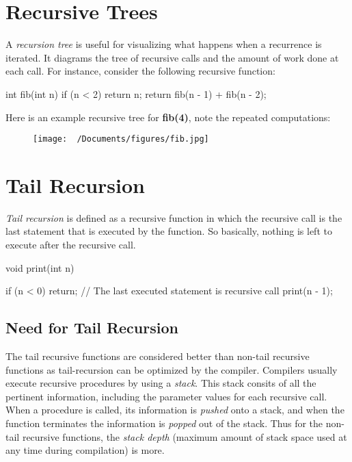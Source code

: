 \documentclass{report}
\begin{document}
\section{Recursive Trees}
A \textit{recursion tree} is useful for visualizing what happens when a recurrence is iterated. It diagrams the tree of recursive calls and the amount of work done at each call.
\bigbreak \noindent
For instance, consider the following recursive function:
\begin{cppcode}
  int fib(int n) {
    if (n < 2)
      return n;
    return fib(n - 1) + fib(n - 2);
  }
\end{cppcode}
\bigbreak \noindent 
Here is an example recursive tree for \textbf{fib(4)}, note the repeated computations:
\begin{figure}[H]
\centering
\texttt{[image:  ~/Documents/figures/fib.jpg]}
\end{figure}
\section{Tail Recursion}
\textit{Tail recursion} is defined as a recursive function in which the recursive call is the last statement that is executed by the function. So basically, nothing is left to execute after the recursive call.
\bigbreak \noindent
\begin{cppcode}
  void print(int n) {

    if (n < 0) {
      return;
    }
    // The last executed statement is recursive call
    print(n - 1);
}
\end{cppcode}
\subsection{Need for Tail Recursion}
The tail recursive functions are considered better than non-tail recursive functions as tail-recursion can be optimized by the compiler.
\bigbreak \noindent
Compilers usually execute recursive procedures by using a \textit{stack}. This stack consits of all the pertinent information, including the parameter values for each recursive call.
\bigbreak \noindent
When a procedure is called, its information is \textit{pushed} onto a stack, and when the function terminates the information is \textit{popped} out of the stack. Thus for the non-tail recursive functions, the \textit{stack depth} (maximum amount of stack space used at any time during compilation) is more.
\end{document}
